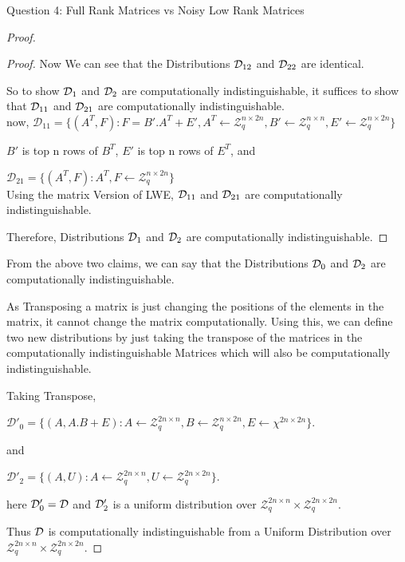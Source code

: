 \begin{solution}{Question 4: Full Rank Matrices vs Noisy Low Rank Matrices}
\begin{proof}
\begin{proof}
         Now We can see that the Distributions $\mathcal{D}_{12}$ and $\mathcal{D}_{22}$ are identical.

         So to show $\mathcal{D}_1$ and $\mathcal{D}_2$ are computationally indistinguishable, it suffices to show that $\mathcal{D}_{11}$ and $\mathcal{D}_{21}$ are computationally indistinguishable.\\

         now, $\mathcal{D}_{11} = \{ (A^T,F): F = B' . A^T + E', A^T \leftarrow \mathcal{Z}_q^{n\times 2n}, B' \leftarrow \mathcal{Z}_q^{n\times n}, E' \leftarrow \mathcal{Z}_q^{n\times 2n}\}$

         $B'$ is top n rows of $B^T$, $E'$ is  top n rows of $E^T$, and 
         
         $\mathcal{D}_{21} = \{ (A^T,F):  A^T,F \leftarrow \mathcal{Z}_q^{n\times 2n} \}$\\

        Using the matrix Version of LWE, $\mathcal{D}_{11}$ and $\mathcal{D}_{21}$ are computationally indistinguishable.

        Therefore, Distributions $\mathcal{D}_1$ and $\mathcal{D}_2$ are computationally indistinguishable.
    \end{proof}


From the above two claims, we can say that the Distributions $\mathcal{D}_0$ and $\mathcal{D}_2$ are computationally indistinguishable.

As Transposing a matrix is just changing the positions of the elements in the matrix, it cannot change the matrix computationally. Using this, we can define two new distributions by just taking the transpose of the matrices in the computationally indistinguishable Matrices which will also be computationally indistinguishable.

Taking Transpose,

$\mathcal{D'}_0 = \{ (A,A.B +E) : A \leftarrow \mathcal{Z}_q^{2n\times n}, B \leftarrow \mathcal{Z}_q^{n\times 2n}, E \leftarrow \chi^{2n\times 2n} \}$.

and

$\mathcal{D'}_2 = \{ (A,U) : A \leftarrow \mathcal{Z}_q^{2n\times n}, U \leftarrow \mathcal{Z}_q^{2n\times 2n} \}$.

here $\mathcal{D}'_0 = \mathcal{D}$ and $\mathcal{D}'_2$ is a uniform distribution over $\mathcal{Z}_q^{2n\times n} \times \mathcal{Z}_q^{2n\times 2n}$.

Thus $\mathcal{D}$ is computationally indistinguishable from a Uniform Distribution over $\mathcal{Z}_q^{2n\times n} \times \mathcal{Z}_q^{2n\times 2n}$.
    \end{proof}
\end{solution}
